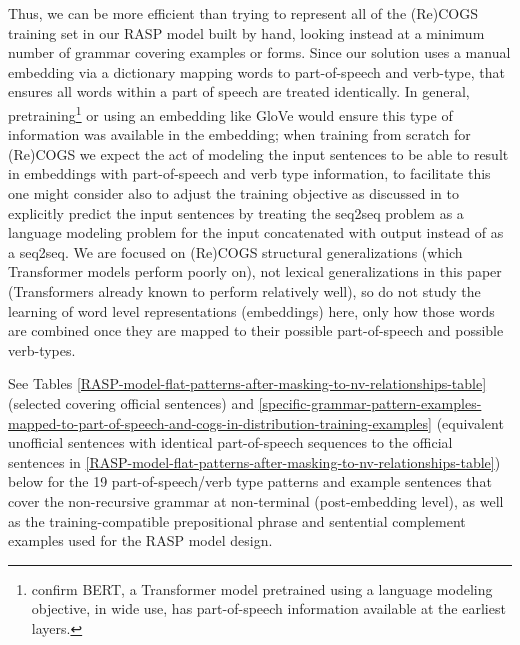 \documentclass[11pt]{article}
\begin{document}
Thus, we can be more efficient than trying to represent all of the (Re)COGS training set in our RASP model built by hand, looking instead at a minimum number of grammar covering examples or forms.
Since our solution uses a manual embedding via a dictionary mapping words to part-of-speech and verb-type, that ensures all words within a part of speech are treated identically. In general, pretraining\footnote{\citep{tenney2019bertrediscoversclassicalnlp} confirm BERT, a Transformer model pretrained using a language modeling objective, in wide use, has part-of-speech information available at the earliest layers.} or using an embedding like GloVe \citep{pennington-etal-2014-glove} would ensure this type of information was available in the embedding; when training from scratch for (Re)COGS we expect the act of modeling the input sentences to be able to result in embeddings with part-of-speech and verb type information, to facilitate this one might consider also to adjust the training objective as discussed in \citep{10.1162/tacl_a_00733} to explicitly predict the input sentences by treating the seq2seq problem as a language modeling problem for the input concatenated with output instead of as a seq2seq. We are focused on (Re)COGS structural generalizations (which Transformer models perform poorly on), not lexical generalizations in this paper (Transformers already known to perform relatively well), so do not study the learning of word level representations (embeddings) here, only how those words are combined once they are mapped to their possible part-of-speech and possible verb-types.

See Tables \ref{RASP-model-flat-patterns-after-masking-to-nv-relationships-table} (selected covering official sentences) and \ref{specific-grammar-pattern-examples-mapped-to-part-of-speech-and-cogs-in-distribution-training-examples} (equivalent unofficial sentences with identical part-of-speech sequences to the official sentences in \ref{RASP-model-flat-patterns-after-masking-to-nv-relationships-table}) below for the 19 part-of-speech/verb type patterns and example sentences that cover the non-recursive grammar at non-terminal (post-embedding level), as well as the training-compatible prepositional phrase and sentential complement examples used for the RASP model design.
\end{document}
